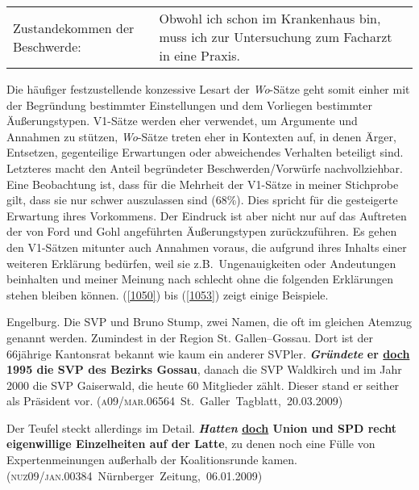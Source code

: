 \begin{exe}
	\ex\label{1049} 
	\begin{tabularx}{\linewidth}[t]{@{}lX}
	Zustandekommen der Beschwerde: & Obwohl ich schon im Krankenhaus bin, muss ich zur Untersuchung zum Facharzt in eine Praxis.\\
	\end{tabularx}
\end{exe}
Die häufiger festzustellende konzessive Lesart der \textit{Wo}-Sätze geht somit einher mit der Begründung bestimmter Einstellungen und dem Vorliegen bestimmter Äußerungstypen. V1-Sätze werden eher verwendet, um Argumente und Annahmen zu stützen, \textit{Wo}-Sätze treten eher in Kontexten auf, in denen Ärger, Entsetzen, gegenteilige Erwartungen oder abweichendes Verhalten beteiligt sind. Letz\-teres macht den Anteil begründeter Beschwerden/Vorwürfe nachvollziehbar. Eine Beobachtung ist, dass für die Mehrheit der V1-Sätze in meiner Stichprobe gilt, dass sie nur schwer auszulassen sind (68\%). Dies spricht für die gesteigerte Erwartung ihres Vorkommens. Der Eindruck ist aber nicht nur auf das Auftreten der von Ford und Gohl angeführten Äußerungstypen zurückzuführen. Es gehen den V1-Sätzen mitunter auch Annahmen voraus, die aufgrund ihres Inhalts einer weiteren Erklärung bedürfen, weil sie z.B.\ Ungenauigkeiten oder Andeutungen beinhalten und meiner Mei\-nung nach schlecht ohne die folgenden Erklärungen stehen bleiben können. (\ref{1050}) bis (\ref{1053}) zeigt einige Beispiele.

\begin{exe}
	\ex\label{1050} 

	Engelburg. Die SVP und Bruno Stump, zwei Namen, die oft im gleichen Atemzug genannt werden. Zumindest in der Region St. Gallen–Gossau. Dort ist der 		66jährige Kantonsrat bekannt wie kaum ein anderer SVPler. \textbf{\textit{Gründete} er \ul{doch} 1995 die SVP des Bezirks Gossau}, danach die 		SVP Waldkirch und im Jahr 2000 die SVP Gaiserwald, die heute 60 Mitglieder zählt. Dieser stand er seither als Präsident vor.        
	\newline\hbox{}\hfill\hbox{(\textsc{a09/mar.06564} St. Galler Tagblatt, 20.03.2009)}
\end{exe}

\begin{exe}
	\ex\label{1051} 

	Der Teufel steckt allerdings im Detail. \textbf{\textit{Hatten} \ul{doch} Union und SPD recht eigenwillige Einzelheiten auf der Latte}, zu denen 	noch eine Fülle von Expertenmeinungen außerhalb der Koalitionsrunde kamen.                 
	\newline\hbox{}\hfill\hbox{(\textsc{nuz09/jan.00384} Nürnberger Zeitung, 06.01.2009)}
\end{exe}                                              

